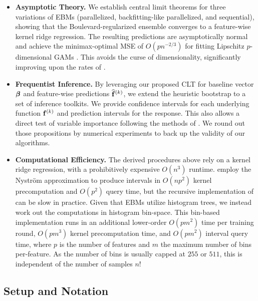 	\vspace{-2ex}
	\begin{itemize}
		\item \textbf{Asymptotic Theory.} We establish central limit theorems for three variations of EBMs (parallelized, backfitting-like parallelized, and sequential), showing that the Boulevard-regularized ensemble converges to a feature-wise kernel ridge regression. The resulting predictions are asymptotically normal and achieve the minimax-optimal MSE of $O(pn^{-2/3})$ for fitting Lipschitz $p$-dimensional GAMs \citep{yuan2015minimaxoptimalratesestimation}. This avoids the curse of dimensionality, significantly improving upon the rates of \cite{zhou2022boulevard, fang2025statistical}.
		
		\item \textbf{Frequentist Inference.} By leveraging our proposed CLT for baseline vector $\bm{\beta}$ and feature-wise predictions $\widehat {\mathbf{f}}^{(k)}$, we extend the heuristic bootstrap to a set of inference toolkits. We provide confidence intervals for each underlying function $\mathbf{f}^{(k)}$ and prediction intervals for the response. This also allows a direct test of variable importance following the methods of \cite{mentch2016randomforestci}. We round out those propositions by numerical experiments to back up the validity of our algorithms.
		
		\item \textbf{Computational Efficiency.} The derived procedures above rely on a kernel ridge regression, with a prohibitively expensive $O(n^3)$ runtime. \cite{fang2025statistical} employ the Nyström approximation to produce intervals in $O(np^2)$ kernel precomputation and $O(p^2)$ query time, but the recursive implementation of \cite{musco2017recursivenystrom} can be slow in practice. Given that EBMs utilize histogram trees, we instead work out the computations in histogram bin-space.
        This bin-based implementation runs in an additional lower-order $O(pm^2)$ time per training round, $O(pm^3)$ kernel precomputation time, and $O(pm^2)$ interval query time, where $p$ is the number of features and $m$ the maximum number of bins per-feature. As the number of bins is usually capped at $255$ or $511$, this is independent of the number of samples $n$!
	\end{itemize}

	\subsection{Setup and Notation}
	\label{ch06b:sec:setup}
	
